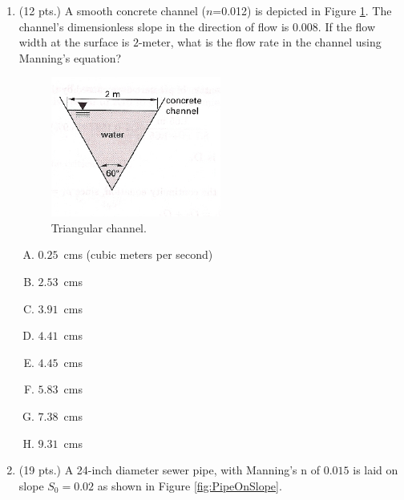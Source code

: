 \documentclass[11pt]{article}
\begin{document}
\begin{enumerate}
\clearpage
\item (12 pts.)
A smooth concrete channel ($n$=0.012) is depicted in Figure \ref{fig:TriangleChannel}.  
The channel's dimensionless slope in the direction of flow is $0.008$.  
If the flow width at the surface is $2$-meter, what is the flow rate in the channel using Manning's equation?

\begin{figure}[h!] %
\centering
   \includegraphics[width=2.2in]{TriangleChannel.jpg}
   \caption{Triangular channel.}
   \label{fig:TriangleChannel} 
\end{figure}

\begin{enumerate} [(A)]
\item $0.25$~cms (cubic meters per second)
\item $2.53$~cms 
\item $3.91$~cms 
\item $4.41$~cms 
\item $4.45$~cms 
\item $5.83$~cms 
\item $7.38$~cms 
\item $9.31$~cms
\end{enumerate}

\clearpage
\item (19 pts.)
A 24-inch diameter sewer pipe, with Manning's n of $0.015$ is laid on slope $S_0 =0.02$ as shown in Figure \ref{fig:PipeOnSlope}.    


\end{enumerate}
\end{document}
